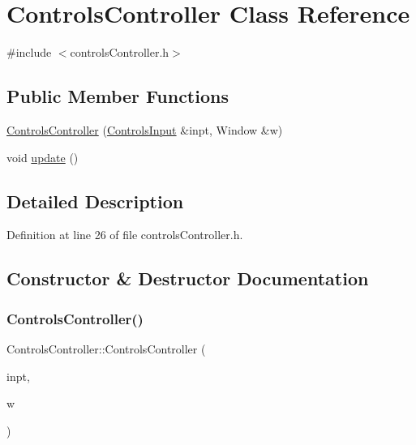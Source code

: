 \hypertarget{class_controls_controller}{}\section{Controls\+Controller Class Reference}
\label{class_controls_controller}


{\ttfamily \#include $<$controls\+Controller.\+h$>$}

\subsection*{Public Member Functions}
\begin{DoxyCompactItemize}
\item 
\hyperlink{class_controls_controller_a560244e70655e8b4f54d8da805c9c2a6}{Controls\+Controller} (\hyperlink{struct_controls_input}{Controls\+Input} \&inpt, Window \&w)
\item 
void \hyperlink{class_controls_controller_a29b1ad7f93658a74035900645d59d9f7}{update} ()
\end{DoxyCompactItemize}


\subsection{Detailed Description}


Definition at line 26 of file controls\+Controller.\+h.



\subsection{Constructor \& Destructor Documentation}
\mbox{\label{class_controls_controller_a560244e70655e8b4f54d8da805c9c2a6}} 
\subsubsection{\texorpdfstring{Controls\+Controller()}{ControlsController()}}
{\footnotesize\ttfamily Controls\+Controller\+::\+Controls\+Controller (\begin{DoxyParamCaption}\item[{\hyperlink{struct_controls_input}{Controls\+Input} \&}]{inpt,  }\item[{Window \&}]{w }\end{DoxyParamCaption})}

